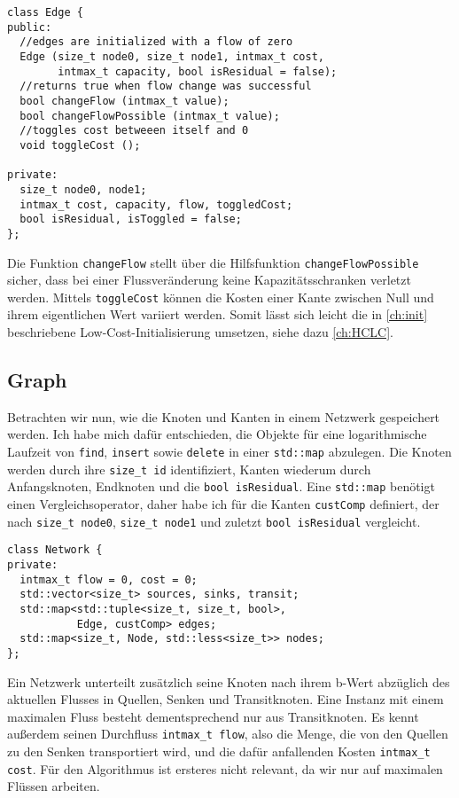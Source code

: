 \begin{lstlisting}
class Edge {
public:
  //edges are initialized with a flow of zero
  Edge (size_t node0, size_t node1, intmax_t cost,
        intmax_t capacity, bool isResidual = false);
  //returns true when flow change was successful
  bool changeFlow (intmax_t value);
  bool changeFlowPossible (intmax_t value);
  //toggles cost betweeen itself and 0
  void toggleCost ();

private:
  size_t node0, node1;
  intmax_t cost, capacity, flow, toggledCost;
  bool isResidual, isToggled = false;
};
\end{lstlisting}

Die Funktion \lstinline|changeFlow| stellt über die Hilfsfunktion \lstinline|changeFlowPossible| sicher, dass bei einer Flussveränderung keine Kapazitätsschranken verletzt werden. Mittels \lstinline|toggleCost| können die Kosten einer Kante zwischen Null und ihrem eigentlichen Wert variiert werden. Somit lässt sich leicht die in \cref{ch:init} beschriebene Low-Cost-Initialisierung umsetzen, siehe dazu \cref{ch:HCLC}.

\subsection{Graph}\label{ch:graph}
Betrachten wir nun, wie die Knoten und Kanten in einem Netzwerk gespeichert werden. Ich habe mich dafür entschieden, die Objekte für eine logarithmische Laufzeit von \lstinline|find|, \lstinline|insert| sowie \lstinline|delete| in einer \lstinline|std::map| abzulegen. Die Knoten werden durch ihre \lstinline|size_t id| identifiziert, Kanten wiederum durch Anfangsknoten, Endknoten und die \lstinline|bool isResidual|. Eine \lstinline|std::map| benötigt einen Vergleichsoperator, daher habe ich für die Kanten \lstinline|custComp| definiert, der nach \lstinline|size_t node0|, \lstinline|size_t node1| und zuletzt \lstinline|bool isResidual| vergleicht.

\begin{lstlisting}
class Network {
private:
  intmax_t flow = 0, cost = 0;
  std::vector<size_t> sources, sinks, transit;
  std::map<std::tuple<size_t, size_t, bool>,
           Edge, custComp> edges;
  std::map<size_t, Node, std::less<size_t>> nodes;
};
\end{lstlisting}

Ein Netzwerk unterteilt zusätzlich seine Knoten nach ihrem b-Wert abzüglich des aktuellen Flusses in Quellen, Senken und Transitknoten. Eine Instanz mit einem maximalen Fluss besteht dementsprechend nur aus Transitknoten. Es kennt außerdem seinen Durchfluss \lstinline|intmax_t flow|, also die Menge, die von den Quellen zu den Senken transportiert wird, und die dafür anfallenden Kosten \lstinline|intmax_t cost|. Für den Algorithmus ist ersteres nicht relevant, da wir nur auf maximalen Flüssen arbeiten.

